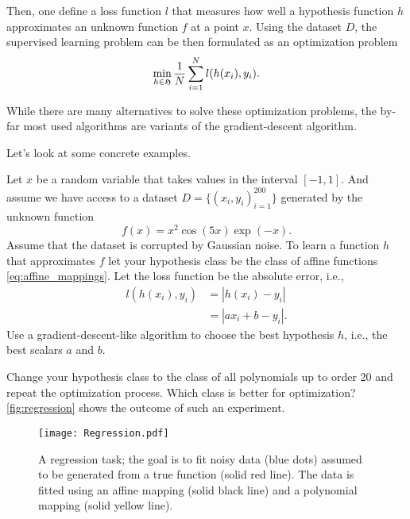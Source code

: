 Then, one define a loss function $l$ that measures how well a hypothesis
function $h$ approximates an unknown function $f$ at a point $x$. Using the
dataset $D$, the supervised learning
problem can be then formulated as an optimization problem 
\begin{equation}
    \min_{h \in \frak{H}} \frac{1}{N}\sum_{i=1}^{N}l(h(x_i), y_i).
\end{equation}

While there are many alternatives to solve these optimization problems, the
by-far most used algorithms are variants of the gradient-descent algorithm. 

Let's look at some concrete examples. 

\begin{boxedexample}[Regression] \complementary{\theexample}
    \label{ex:regression}
    Let $x$ be a random variable that takes values in the interval $[-1,1]$. And assume we
    have access to a dataset $D = \{(x_i, y_i)_{i=1}^{200}\}$ generated by the unknown
    function 
    $$
    f(x) = x^2 \cos(5x) \exp(-x).
    $$ 
    Assume that the dataset is corrupted by Gaussian noise.
    To learn a function $h$ that approximates $f$ let your hypothesis class be
    the class of affine functions \eqref{eq:affine_mappings}. Let the loss
    function be the absolute error, i.e., 
    \begin{align*}
    l(h(x_i), y_i) &= |h(x_i)- y_i| \\
& = |ax_i + b - y_i|.
    \end{align*}
    Use a gradient-descent-like algorithm to choose the best hypothesis $h$,
    i.e., the best scalars $a$ and $b$. 

    Change your hypothesis class to the class of all polynomials up to   order
    20 and repeat the optimization process. Which class is better for
    optimization? \autoref{fig:regression} shows the outcome of such an experiment.
\end{boxedexample}
\begin{figure}[htbp]
    \centering
    \texttt{[image: Regression.pdf]}
    \caption{A regression task; the goal is to fit noisy data (blue dots) assumed to be generated from a true function (solid red line). The data is fitted using an affine mapping (solid black line) and a polynomial mapping (solid yellow line).}
    \label{fig:regression}
\end{figure}   

